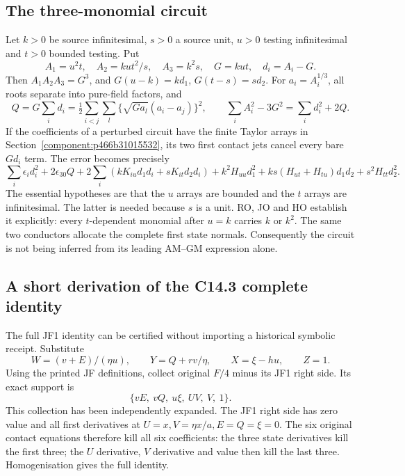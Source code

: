 \subsection{The three-monomial circuit}

Let $k>0$ be source infinitesimal, $s>0$ a source unit,
$u>0$ testing infinitesimal and $t>0$ bounded testing.  Put
\[
 A_1=u^2t,\quad A_2=ku t^2/s,\quad A_3=k^2s,
 \quad G=kut,\quad d_i=A_i-G.
\]
Then $A_1A_2A_3=G^3$, and
$G(u-k)=kd_1$, $G(t-s)=sd_2$.
For $a_i=A_i^{1/3}$, all roots separate into pure-field factors,
and
\[
 Q=G\sum_i d_i
   =\tfrac12\sum_{i<j}\sum_l
       \{\sqrt{Ga_l}(a_i-a_j)\}^2,
 \qquad \sum_iA_i^2-3G^2=\sum_i d_i^2+2Q.
\]
If the coefficients of a perturbed circuit have the finite Taylor
arrays in Section~\ref{component:p466b31015532}, its two first contact jets cancel every
bare $Gd_i$ term.  The error becomes precisely
\[
 \sum_i\epsilon_i d_i^2+2\epsilon_{30}Q
 +2\sum_i(kK_{iu}d_1d_i+sK_{it}d_2d_i)
 +k^2H_{uu}d_1^2+ks(H_{ut}+H_{tu})d_1d_2+s^2H_{tt}d_2^2.
\]
The essential hypotheses are that the $u$ arrays are bounded and
the $t$ arrays are infinitesimal.  The latter is needed because
$s$ is a unit.  RO, JO and HO establish it explicitly: every
$t$-dependent monomial after $u=k$ carries $k$ or $k^2$.
The same two conductors allocate the complete first state normals.
Consequently the circuit is not being inferred from its leading
AM--GM expression alone.

\subsection{A short derivation of the C14.3 complete identity}

The full JF1 identity can be certified without importing a historical
symbolic receipt.  Substitute
\[
 W=(v+E)/(\eta u),\qquad Y=Q+rv/\eta,
 \qquad X=\xi-hu,\qquad Z=1.
\]
Using the printed JF definitions, collect original $F/4$ minus its
JF1 right side.  Its exact support is
\[
                    \{vE,\ vQ,\ u\xi,\ UV,\ V,\ 1\}.
\]
This collection has been independently expanded.  The JF1 right
side has zero value and all first derivatives at
$U=x,V=\eta x/a,E=Q=\xi=0$.  The six original contact equations
therefore kill all six coefficients: the three state derivatives
kill the first three; the $U$ derivative, $V$ derivative and value
then kill the last three.  Homogenisation gives the full identity.

